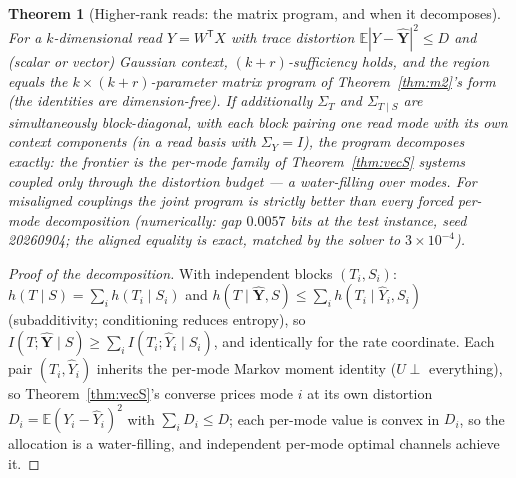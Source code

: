 \documentclass[11pt]{article}
\newtheorem{theorem}{Theorem}\newtheorem{corollary}{Corollary}
\newcommand{\E}{\mathbb{E}}\newcommand{\tr}{\operatorname{tr}}
\newcommand{\hY}{\widehat Y}
\begin{document}
\begin{theorem}[Higher-rank reads: the matrix program, and when it
decomposes]\label{thm:rankk}
For a $k$-dimensional read $Y=W^{\mathsf T}X$ with trace distortion
$\E|Y-\hat{\mathbf Y}|^2\le D$ and (scalar or vector) Gaussian context,
$(k{+}r)$-sufficiency holds, and the region equals the
$k\times(k{+}r)$-parameter matrix program of Theorem~\ref{thm:m2}'s form
(the identities are dimension-free). If additionally $\Sigma_T$ and
$\Sigma_{T\mid S}$ are simultaneously block-diagonal, with each block
pairing one read mode with its own context components (in a read basis
with $\Sigma_Y=I$), the program \emph{decomposes exactly}: the frontier
is the per-mode family of Theorem~\ref{thm:vecS} systems coupled only
through the distortion budget --- a water-filling over modes. For
misaligned couplings the joint program is strictly better than every
forced per-mode decomposition (numerically: gap $0.0057$ bits at the test
instance, seed 20260904; the aligned equality is exact, matched by the
solver to $3\times10^{-4}$).
\end{theorem}
\begin{proof}[Proof of the decomposition]
With independent blocks $(T_i,S_i)$:
$h(T\mid S)=\sum_i h(T_i\mid S_i)$ and
$h(T\mid\hat{\mathbf Y},S)\le\sum_i h(T_i\mid\hY_i,S_i)$ (subadditivity;
conditioning reduces entropy), so
$I(T;\hat{\mathbf Y}\mid S)\ge\sum_i I(T_i;\hY_i\mid S_i)$, and
identically for the rate coordinate. Each pair $(T_i,\hY_i)$ inherits the
per-mode Markov moment identity ($U\perp$ everything), so
Theorem~\ref{thm:vecS}'s converse prices mode $i$ at its own distortion
$D_i=\E(Y_i-\hY_i)^2$ with $\sum_iD_i\le D$; each per-mode value is
convex in $D_i$, so the allocation is a water-filling, and independent
per-mode optimal channels achieve it.
\end{proof}
\end{document}
